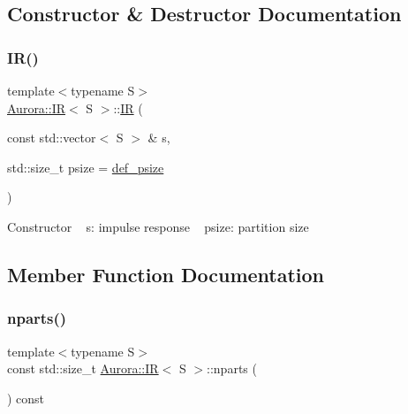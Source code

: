 \subsection{Constructor \& Destructor Documentation}
\mbox{\label{class_aurora_1_1_i_r_a2efce1ea1cacb440e68195209fb2e5e2}} 
\subsubsection{\texorpdfstring{I\+R()}{IR()}}
{\footnotesize\ttfamily template$<$typename S$>$ \\
\hyperlink{class_aurora_1_1_i_r}{Aurora\+::\+IR}$<$ S $>$\+::\hyperlink{class_aurora_1_1_i_r}{IR} (\begin{DoxyParamCaption}\item[{const std\+::vector$<$ S $>$ \&}]{s,  }\item[{std\+::size\+\_\+t}]{psize = {\ttfamily \hyperlink{namespace_aurora_a080d03c33477d9c6322278722ca8e472}{def\+\_\+psize}} }\end{DoxyParamCaption})\hspace{0.3cm}{\ttfamily [inline]}}

Constructor ~\newline
s\+: impulse response ~\newline
psize\+: partition size 

\subsection{Member Function Documentation}
\mbox{\label{class_aurora_1_1_i_r_a77d0fec4d82334a2f5533b4c8044c4e1}} 
\subsubsection{\texorpdfstring{nparts()}{nparts()}}
{\footnotesize\ttfamily template$<$typename S$>$ \\
const std\+::size\+\_\+t \hyperlink{class_aurora_1_1_i_r}{Aurora\+::\+IR}$<$ S $>$\+::nparts (\begin{DoxyParamCaption}{ }\end{DoxyParamCaption}) const\hspace{0.3cm}{\ttfamily [inline]}}

